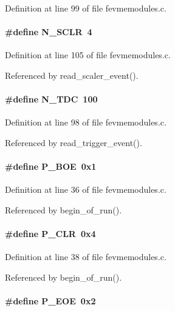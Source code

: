 Definition at line 99 of file fevmemodules.c.
\paragraph[{N\_\-SCLR}]{\setlength{\rightskip}{0pt plus 5cm}\#define N\_\-SCLR~4}\hfill\label{fevmemodules_8c_ad2e95a3b1cf99277a9faad8a41d0ab8b}


Definition at line 105 of file fevmemodules.c.

Referenced by read\_\-scaler\_\-event().
\paragraph[{N\_\-TDC}]{\setlength{\rightskip}{0pt plus 5cm}\#define N\_\-TDC~100}\hfill\label{fevmemodules_8c_a7e9c82b300255f54b1528c66fdcdfafd}


Definition at line 98 of file fevmemodules.c.

Referenced by read\_\-trigger\_\-event().
\paragraph[{P\_\-BOE}]{\setlength{\rightskip}{0pt plus 5cm}\#define P\_\-BOE~0x1}\hfill\label{fevmemodules_8c_ad6c3e6f40d580b713afb1d8f4fe92dd7}


Definition at line 36 of file fevmemodules.c.

Referenced by begin\_\-of\_\-run().
\paragraph[{P\_\-CLR}]{\setlength{\rightskip}{0pt plus 5cm}\#define P\_\-CLR~0x4}\hfill\label{fevmemodules_8c_ae4e1fdc925f086a479d7e889dbfaaf9e}


Definition at line 38 of file fevmemodules.c.

Referenced by begin\_\-of\_\-run().
\paragraph[{P\_\-EOE}]{\setlength{\rightskip}{0pt plus 5cm}\#define P\_\-EOE~0x2}\hfill\label{fevmemodules_8c_a93d7238f44b662d68192a2091933821e}


